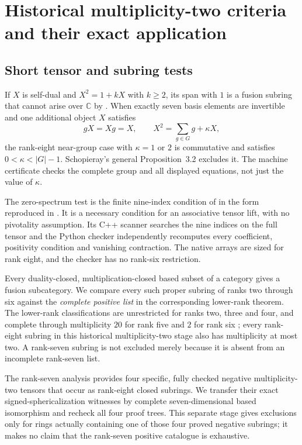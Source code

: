 \documentclass[11pt,reqno]{amsart}
\theoremstyle{definition}
\theoremstyle{remark}
\newcommand{\C}{\mathbb C}
\begin{document}


\section{Historical multiplicity-two criteria and their exact application}
\subsection{Short tensor and subring tests}
If $X$ is self-dual and $X^2=1+kX$ with $k\ge2$, its span with $1$ is a fusion subring that cannot arise over $\C$ by \cite{R2,Ostrik2}. When exactly seven basis elements are invertible and one additional object $X$ satisfies
\[
gX=Xg=X,\qquad X^2=\sum_{g\in G}g+\kappa X,
\]
the rank-eight near-group case with $\kappa=1$ or $2$ is commutative and satisfies $0<\kappa<|G|-1$. Schopieray's general Proposition~3.2 \cite{SchNear} excludes it. The machine certificate checks the complete group and all displayed equations, not just the value of $\kappa$.

The zero-spectrum test is the finite nine-index condition of \cite[Theorem~2.14]{LPR} in the form reproduced in \cite[Section~3]{R6}. It is a necessary condition for an associative tensor lift, with no pivotality assumption. Its C++ scanner searches the nine indices on the full tensor and the Python checker independently recomputes every coefficient, positivity condition and vanishing contraction. The native arrays are sized for rank eight, and the checker has no rank-six restriction.

Every duality-closed, multiplication-closed based subset of a category gives a fusion subcategory. We compare every such proper subring of ranks two through six against the \emph{complete positive list} in the corresponding lower-rank theorem. The lower-rank classifications are unrestricted for ranks two, three and four, and complete through multiplicity $20$ for rank five and $2$ for rank six \cite{R2,R3,R4,R5,R6}; every rank-eight subring in this historical multiplicity-two stage also has multiplicity at most two. A rank-seven subring is not excluded merely because it is absent from an incomplete rank-seven list.

The rank-seven analysis \cite{R7} provides four specific, fully checked negative multiplicity-two tensors that occur as rank-eight closed subrings. We transfer their exact signed-sphericalization witnesses by complete seven-dimensional based isomorphism and recheck all four proof trees. This separate stage gives exclusions only for rings actually containing one of those four proved negative subrings; it makes no claim that the rank-seven positive catalogue is exhaustive.
\end{document}
